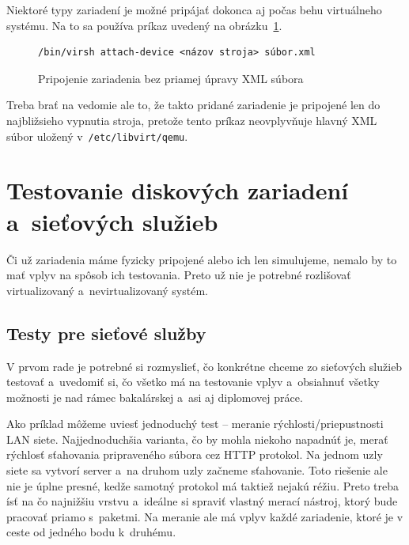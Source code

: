 Niektoré typy zariadení je možné pripájať dokonca aj počas behu virtuálneho
systému. Na to sa používa príkaz uvedený na obrázku~\ref{alg:virsh-attach-device}.

\begin{figure}[H]
\begin{lstlisting}
/bin/virsh attach-device <názov stroja> súbor.xml
\end{lstlisting}
\caption{Pripojenie zariadenia bez priamej úpravy XML súbora}
\label{alg:virsh-attach-device}
\end{figure}

Treba brať na vedomie ale to, že takto pridané zariadenie je pripojené len do
najbližsieho vypnutia stroja, pretože tento príkaz neovplyvňuje hlavný XML
súbor uložený v~\texttt{/etc/libvirt/qemu}.

%
%

\chapter{Testovanie diskových zariadení a~sieťových služieb}

Či už zariadenia máme fyzicky pripojené alebo ich len simulujeme, nemalo by to
mať vplyv na spôsob ich testovania. Preto už nie je potrebné rozlišovať
virtualizovaný a~nevirtualizovaný systém.

%
%

\section{Testy pre sieťové služby}

V prvom rade je potrebné si rozmyslieť, čo konkrétne chceme zo sieťových
služieb testovať a~uvedomiť si, čo všetko má na testovanie vplyv a~obsiahnuť
všetky možnosti je nad rámec bakalárskej a~asi aj diplomovej práce.

Ako príklad môžeme uviesť jednoduchý test -- meranie rýchlosti/priepustnosti
LAN siete.  Najjednoduchšia varianta, čo by mohla niekoho napadnúť je, merať
rýchlosť sťahovania pripraveného súbora cez HTTP protokol. Na jednom uzly siete
sa vytvorí server a~na druhom uzly začneme sťahovanie. Toto riešenie ale nie je
úplne presné, kedže samotný protokol má taktiež nejakú réžiu. Preto treba ísť
na čo najnižšiu vrstvu a~ideálne si spraviť vlastný merací nástroj, ktorý bude
pracovať priamo s~paketmi. Na meranie ale má vplyv každé zariadenie, ktoré je
v ceste od jedného bodu k~druhému.

